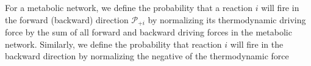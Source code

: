 For a metabolic network, we define the probability that a reaction $i$ will fire in the forward (backward)  direction ${\mathcal P_{+i}}$ by normalizing its thermodynamic driving force by the sum of all forward and backward driving forces in the metabolic network. Similarly, we define the probability that reaction $i$ will fire in the backward direction by normalizing the negative of the thermodynamic force